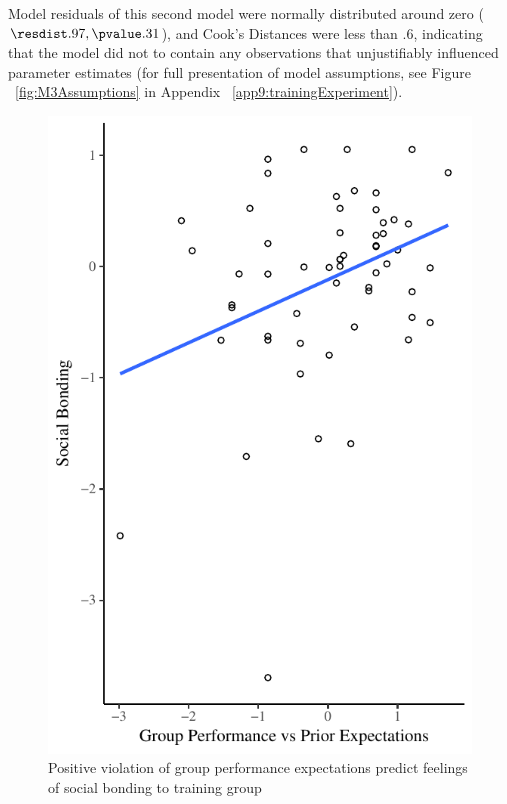 Model residuals of this second model were normally distributed around zero ($\resdist .97, \pvalue .31$), and Cook's Distances were less than $.6$, indicating that the model did not to contain any observations that unjustifiably influenced parameter estimates (for full presentation of model assumptions, see Figure ~\ref{fig:M3Assumptions} in Appendix ~\ref{app9:trainingExperiment}).

\begin{figure}
  \centering
  \includegraphics[width=0.5\linewidth,keepaspectratio] {images/groupPerfExpBondConditionScatter}
  \caption{Positive violation of group performance expectations
 predict feelings of social bonding to training group}
 \label{fig:groupPerfExpBondConditionScatter}
\end{figure}








